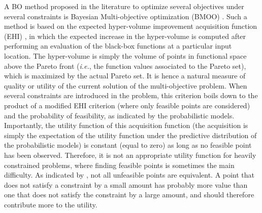 \documentclass[review,preprint,12pt]{elsarticle}
\begin{document}
A BO method proposed in the literature to optimize several objectives
under several constraints is Bayesian Multi-objective optimization (BMOO) 
\citep{feliot2015bayesian}. Such a method is based on the expected 
hyper-volume improvement acquisition function (EHI) \citep{emmerich2008computation}, in which 
the expected increase in the hyper-volume is computed after performing an evaluation of 
the black-box functions at a particular input location. The hyper-volume is simply the volume 
of points in functional space above the Pareto front (\emph{i.e.}, the function values associated 
to the Pareto set), which is maximized by the actual Pareto set.
It is hence a natural measure of quality or utility of the current solution of the 
multi-objective problem. When several constraints are introduced in the problem, this criterion boils down to 
the product of a modified EHI criterion (where only feasible points are considered) and the probability of 
feasibility, as indicated by the probabilistic models. Importantly, the utility function
of this acquisition function (the acquisition is simply the expectation of the utility function under 
the predictive distribution of the probabilistic models) is constant (equal to zero) as long as no feasible 
point has been observed. Therefore, it is not an appropriate utility function for heavily constrained problems, where 
finding feasible points is sometimes the main difficulty. As indicated by \cite{feliot2015bayesian}, not all 
unfeasible points are equivalent. A point that does not satisfy a constraint by a small amount has probably 
more value than one that does not satisfy the constraint by a large amount, and should therefore contribute more 
to the utility.
\end{document}

